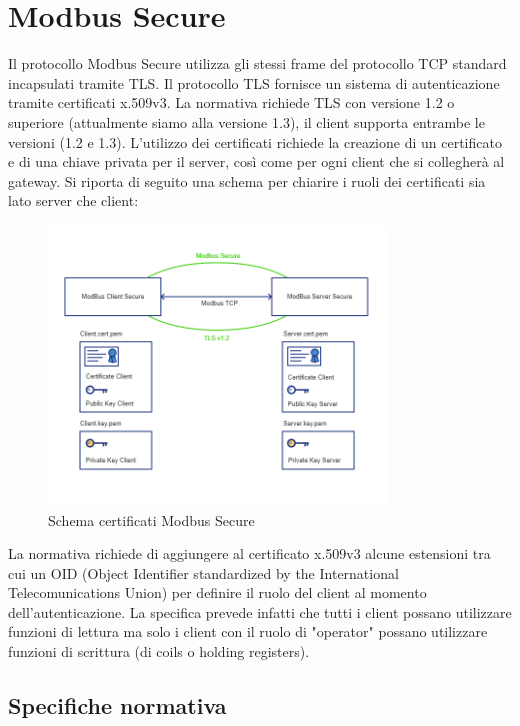 
\chapter{Modbus Secure}
\label{secure}

Il protocollo Modbus Secure utilizza gli stessi frame del protocollo TCP
standard incapsulati tramite TLS.
Il protocollo TLS fornisce un sistema di autenticazione tramite certificati x.509v3. 
La normativa richiede
TLS con versione 1.2 o superiore (attualmente siamo alla versione 1.3),
il client supporta entrambe le versioni (1.2 e 1.3). 
L'utilizzo dei certificati richiede la creazione di un certificato e di una chiave
privata per il server, così come per ogni client che si collegherà al gateway. 
Si riporta di seguito una schema per chiarire i
ruoli dei certificati sia lato server che client:

\begin{figure}[H]
  \centering
  \includegraphics[width=0.8\textwidth]{../Img/schemamodbussecure.png}
  \caption{Schema certificati Modbus Secure}
\end{figure}

La normativa richiede di aggiungere al certificato x.509v3 alcune estensioni tra cui un OID (Object
Identifier standardized by the International Telecomunications Union) per definire il ruolo del client al
momento dell'autenticazione. La specifica prevede infatti che tutti i client possano utilizzare funzioni di
lettura ma solo i client con il ruolo di "operator" possano utilizzare funzioni di scrittura (di coils o holding
registers).

\newpage
\section{Specifiche normativa}

